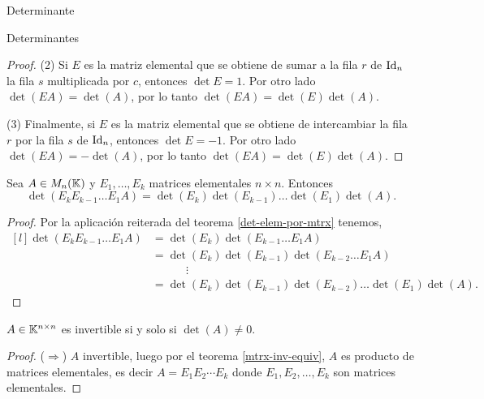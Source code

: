 \begin{chapter}{Determinante}
\begin{section}{Determinantes}
\begin{proof}
            
            (2) Si $E$ es la matriz elemental que se obtiene de sumar a la fila $r$ de $\operatorname{Id}_n$  la fila $s$ multiplicada por $c$, entonces $\det E =1$. Por  otro lado  $\det(EA) = \det(A)$, por lo tanto  $\det(EA) = \det(E)\det(A)$.
            
            (3) Finalmente, si $E$ es la matriz elemental que se obtiene de intercambiar la fila $r$ por la fila $s$ de $\operatorname{Id}_n$, entonces $\det E=-1$. Por  otro lado  $\det(EA) = -\det(A)$, por lo tanto  $\det(EA) = \det(E)\det(A)$.
        \end{proof}

        \begin{corolario}\label{coro-det-prod-elem-mtrx}
            Sea $A  \in M_n(\mathbb K)$ y $E_1,\ldots,E_k$ matrices elementales $n \times n$. Entonces
            \begin{equation*}
            \det (E_kE_{k-1}\ldots E_1A) = \det (E_k) \det (E_{k-1})\ldots \det (E_1) \det (A).
            \end{equation*}  
        \end{corolario}
        \begin{proof}
            Por  la aplicación reiterada del teorema \ref{det-elem-por-mtrx} tenemos, 
            \begin{equation*}
            \begin{matrix*}[l]
            \det (E_kE_{k-1}\ldots E_1A) &= \det (E_k) \det(E_{k-1}\ldots E_1 A) \\
            &= \det( E_k) \det(E_{k-1})\det(E_{k-2}\ldots E_1A) \\
            &\qquad\quad \vdots \\
            & = \det( E_k) \det(E_{k-1})\det(E_{k-2})\ldots \det(E_1) \det(A).
            \end{matrix*}		
            \end{equation*}
        \end{proof}

        \begin{teorema}\label{th-det-matriz-invertible}
            $A \in \mathbb K^{n \times n}$ es invertible si y solo si $\det(A) \ne 0$.
        \end{teorema}
        \begin{proof}
            ($\Rightarrow$)  $A$ invertible, luego por el  teorema \ref{mtrx-inv-equiv}, $A$ es producto de matrices elementales, es decir  $A = E_1 E_2 \cdots E_k$  donde $E_1, E_2, \ldots, E_k$ son matrices elementales. 
            

\end{proof}
\end{section}
\end{chapter}
